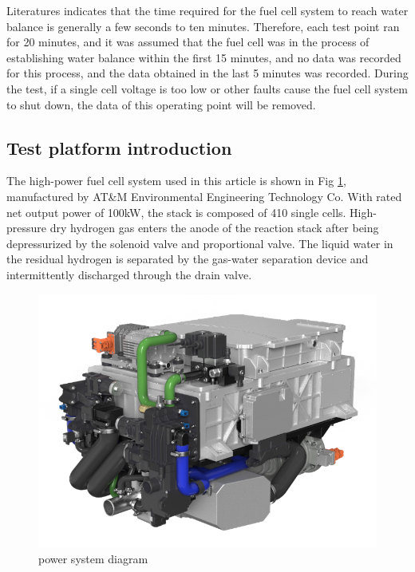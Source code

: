 Literatures\cite{wuDiagnosticToolsPEM2008} indicates that the time required for the fuel cell system to reach water balance is generally a few seconds to ten minutes. Therefore, each test point ran for 20 minutes, and it was assumed that the fuel cell was in the process of establishing water balance within the first 15 minutes, and no data was recorded for this process, and the data obtained in the last 5 minutes was recorded. During the test, if a single cell voltage is too low or other faults cause the fuel cell system to shut down, the data of this operating point will be removed.

\subsection{Test platform introduction}
The high-power fuel cell system used in this article is shown in Fig \ref{fig:PowerSystemDiagram}, manufactured by AT\&M Environmental Engineering Technology Co. With rated net output power of 100kW, the stack is composed of 410 single cells. High-pressure dry hydrogen gas enters the anode of the reaction stack after being depressurized by the solenoid valve and proportional valve. The liquid water in the residual hydrogen is separated by the gas-water separation device and intermittently discharged through the drain valve.
\begin{figure}[h]
	\centering
	
	\includegraphics[scale=0.4]{Research_pictures/picture2.png}
	\caption[short]{power system diagram}
	\label{fig:PowerSystemDiagram}
\end{figure}

